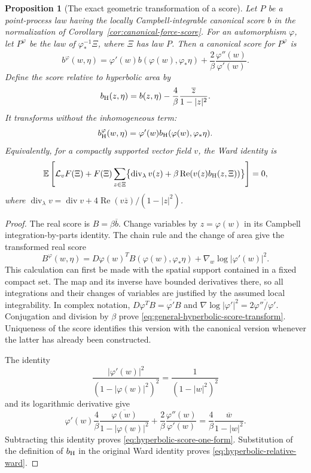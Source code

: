 \documentclass[11pt,a4paper]{article}
\numberwithin{equation}{section}
\newtheorem{proposition}[theorem]{Proposition}
\theoremstyle{definition}
\theoremstyle{remark}
\newcommand{\E}{\mathbb E}
\begin{document}
\begin{proposition}[The exact geometric transformation of a score]
\label{prop:hyperbolic-score-transform}
Let $P$ be a point-process law having the locally Campbell-integrable
canonical score $b$ in the normalization of
Corollary~\ref{cor:canonical-force-score}. For an automorphism $\varphi$,
let $P^\varphi$ be the law of $\varphi^{-1}_*\Xi$, where $\Xi$ has law
$P$. Then a canonical score for $P^\varphi$ is
\begin{equation}\label{eq:general-hyperbolic-score-transform}
 b^\varphi(w,\eta)
 =\varphi'(w)b(\varphi(w),\varphi_*\eta)
       +\frac2\beta\frac{\varphi''(w)}{\varphi'(w)}.
\end{equation}
Define the score relative to hyperbolic area by
\[
 b_{\rm H}(z,\eta)
 =b(z,\eta)-\frac4\beta\frac{\overline z}{1-|z|^2}.
\]
It transforms without the inhomogeneous term:
\begin{equation}\label{eq:hyperbolic-score-one-form}
 b_{\rm H}^{\varphi}(w,\eta)
 =\varphi'(w)b_{\rm H}(\varphi(w),\varphi_*\eta).
\end{equation}
Equivalently, for a compactly supported vector field $v$, the Ward
identity is
\begin{equation}\label{eq:hyperbolic-relative-ward}
 \E\left[\mathcal L_vF(\Xi)
  +F(\Xi)\sum_{z\in\Xi}
       \bigl\{\operatorname{div}_{\lambda}v(z)
             +\beta\operatorname{Re}(v(z)b_{\rm H}(z,\Xi))\bigr\}\right]=0,
\end{equation}
where
$\operatorname{div}_{\lambda}v=\operatorname{div}v+
4\operatorname{Re}(v\overline z)/(1-|z|^2)$.
\end{proposition}

\begin{proof}
The real score is $B=\beta\overline b$. Change variables by $z=\varphi(w)$
in its Campbell integration-by-parts identity. The chain rule and the
change of area give the transformed real score
\[
 B^\varphi(w,\eta)
  =D\varphi(w)^T B(\varphi(w),\varphi_*\eta)
       +\nabla_w\log|\varphi'(w)|^2.
\]
This calculation can first be made with the spatial support contained
in a fixed compact set. The map and its inverse have bounded derivatives
there, so all integrations and their changes of variables are justified
by the assumed local integrability. In complex notation,
$D\varphi^TB=\overline{\varphi'}B$ and
$\nabla\log|\varphi'|^2=2\overline{\varphi''/\varphi'}$.
Conjugation and division by $\beta$ prove
\eqref{eq:general-hyperbolic-score-transform}. Uniqueness of the score
identifies this version with the canonical version whenever the latter
has already been constructed.

The identity
\[
 \frac{|\varphi'(w)|^2}{(1-|\varphi(w)|^2)^2}
       =\frac1{(1-|w|^2)^2}
\]
and its logarithmic derivative give
\[
 \varphi'(w)\frac4\beta
       \frac{\overline{\varphi(w)}}{1-|\varphi(w)|^2}
       +\frac2\beta\frac{\varphi''(w)}{\varphi'(w)}
 =\frac4\beta\frac{\overline w}{1-|w|^2}.
\]
Subtracting this identity proves \eqref{eq:hyperbolic-score-one-form}.
Substitution of the definition of $b_{\rm H}$ in the original Ward
identity proves \eqref{eq:hyperbolic-relative-ward}.
\end{proof}
\end{document}
